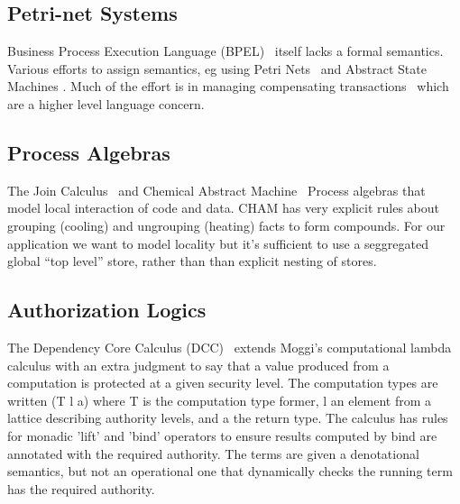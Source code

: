 \subsection{Petri-net Systems}


Business Process Execution Language (BPEL)~\cite{Andrews2003:BPEL} itself lacks a formal semantics. Various efforts to assign semantics, eg using Petri Nets~\cite{Lohmann2009:PetriBPEL} and Abstract State Machines \cite{Fahland2005:SemanticsBPEL}. Much of the effort is in managing compensating transactions~\cite{Colombo2011:Compensating} which are a higher level language concern.


\subsection{Process Algebras}
The Join Calculus~\cite{Cedric1996:Reflexive} and Chemical Abstract Machine~\cite{Berry1992:Chemical} Process algebras that model local interaction of code and data. CHAM has very explicit rules about grouping (cooling) and ungrouping (heating) facts to form compounds. For our application we want to model locality but it's sufficient to use a seggregated global ``top level'' store, rather than than explicit nesting of stores.


\subsection{Authorization Logics}

The Dependency Core Calculus (DCC)~\cite{Abadi1999:DCC} extends Moggi's computational lambda calculus with an extra judgment to say that a value produced from a computation is protected at a given security level. The computation types are written (T l a) where T is the computation type former, l an element from a lattice describing authority levels, and a the return type. The calculus has rules for monadic 'lift' and 'bind' operators to ensure results computed by bind are annotated with the required authority. The terms are given a denotational semantics, but not an operational one that dynamically checks the running term has the required authority.

